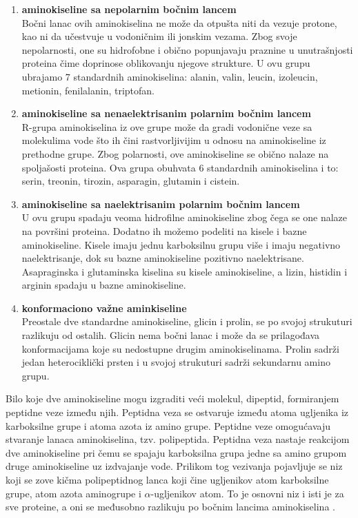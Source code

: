 \begin{enumerate}
	\item \textbf{aminokiseline sa nepolarnim bočnim lancem}\\
	Bočni lanac ovih aminokiselina ne može da otpušta niti da vezuje protone, kao ni da učestvuje u vodoničnim ili jonskim vezama. Zbog svoje nepolarnosti, one su hidrofobne i obično popunjavaju praznine u unutrašnjosti proteina čime doprinose oblikovanju njegove strukture. U ovu grupu ubrajamo 7 standardnih aminokiselina: alanin, valin, leucin, izoleucin, metionin, fenilalanin, triptofan. 
	
	\item \textbf{aminokiseline sa nenaelektrisanim polarnim bočnim lancem}\\
	R-grupa aminokiselina iz ove grupe može da gradi vodonične veze sa molekulima vode što ih čini rastvorljivijim u odnosu na aminokiseline iz prethodne grupe. Zbog polarnosti, ove aminokiseline se obično nalaze na spoljašosti proteina. Ova grupa obuhvata 6 standardnih aminokiselina i to: serin, treonin, tirozin, asparagin, glutamin i cistein. 
	
	\item \textbf{aminokiseline sa naelektrisanim polarnim bočnim lancem}\\
	U ovu grupu spadaju veoma hidrofilne aminokiseline zbog čega se one nalaze na površini proteina. Dodatno ih možemo podeliti na kisele i bazne aminokiseline. Kisele imaju jednu karboksilnu grupu više i imaju negativno naelektrisanje, dok su bazne aminokiseline pozitivno naelektrisane. Asapraginska i glutaminska kiselina su kisele aminokiseline, a lizin, histidin i arginin spadaju u bazne aminokiseline.  
	
	\item \textbf{konformaciono važne aminkiseline}\\
	Preostale dve standardne aminokiseline, glicin i prolin, se po svojoj strukuturi razlikuju od ostalih. Glicin nema bočni lanac i može da se prilagođava konformacijama koje su nedostupne drugim aminokiselinama. Prolin sadrži jedan heterociklički prsten i u svojoj strukuturi sadrži sekundarnu amino grupu. 
\end{enumerate}



Bilo koje dve aminokiseline mogu izgraditi veći molekul, dipeptid, formiranjem peptidne veze između njih. Peptidna veza se ostvaruje između atoma ugljenika iz karboksilne grupe i atoma azota iz amino grupe. Peptidne veze omogućavaju stvaranje lanaca aminokiselina, tzv. polipeptida. Peptidna veza nastaje reakcijom dve aminokiseline pri čemu se spajaju karboksilna grupa jedne sa amino grupom druge aminokiseline uz izdvajanje vode. Prilikom tog vezivanja pojavljuje se niz koji se zove kičma polipeptidnog lanca koji čine ugljenikov atom karboksilne grupe, atom azota aminogrupe i $\alpha$-ugljenikov atom. To je osnovni niz i isti je za sve proteine, a oni se međusobno razlikuju po bočnim lancima aminokiselina \cite{biohUdz, bioinf}.


